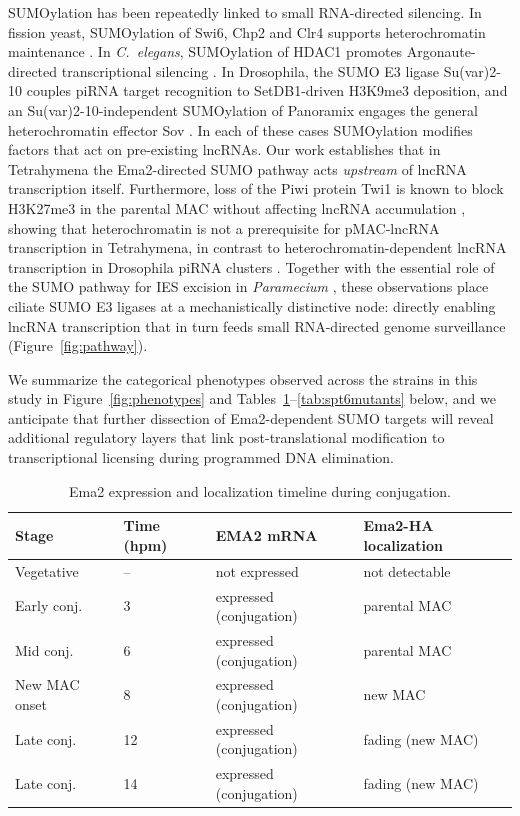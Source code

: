 \documentclass[11pt]{article}
\begin{document}
SUMOylation has been repeatedly linked to small RNA-directed silencing.
In fission yeast, SUMOylation of Swi6, Chp2 and Clr4 supports heterochromatin
maintenance \citep{shin2005sumo}. In \emph{C.~elegans}, SUMOylation of
HDAC1 promotes Argonaute-directed transcriptional silencing
\citep{kim2021hdac1}. In Drosophila, the SUMO E3 ligase Su(var)2-10
couples piRNA target recognition to SetDB1-driven H3K9me3 deposition, and
an Su(var)2-10-independent SUMOylation of Panoramix engages the general
heterochromatin effector Sov \citep{ninova2019suvar}. In each of these
cases SUMOylation modifies factors that act on pre-existing lncRNAs. Our
work establishes that in Tetrahymena the Ema2-directed SUMO pathway acts
\emph{upstream} of lncRNA transcription itself. Furthermore, loss of the
Piwi protein Twi1 is known to block H3K27me3 in the parental MAC without
affecting lncRNA accumulation \citep{liu2007rnai,mochizuki2002twi1},
showing that heterochromatin is not a prerequisite for pMAC-lncRNA
transcription in Tetrahymena, in contrast to heterochromatin-dependent
lncRNA transcription in Drosophila piRNA clusters
\citep{andersen2017heterochromatin}. Together with the essential role of
the SUMO pathway for IES excision in \emph{Paramecium}
\citep{matsuda2006sumo}, these observations place ciliate SUMO E3 ligases
at a mechanistically distinctive node: directly enabling lncRNA
transcription that in turn feeds small RNA-directed genome surveillance
(Figure~\ref{fig:pathway}).

We summarize the categorical phenotypes observed across the strains in
this study in Figure~\ref{fig:phenotypes} and
Tables~\ref{tab:timeline}--\ref{tab:spt6mutants} below, and we anticipate
that further dissection of Ema2-dependent SUMO targets will reveal
additional regulatory layers that link post-translational modification to
transcriptional licensing during programmed DNA elimination.

\begin{table}[htbp]
\centering
\caption{Ema2 expression and localization timeline during conjugation.}
\label{tab:timeline}
\begin{tabular}{llll}
\toprule
Stage & Time (hpm) & EMA2 mRNA & Ema2-HA localization \\
\midrule
Vegetative      & --    & not expressed           & not detectable              \\
Early conj.     & 3     & expressed (conjugation) & parental MAC                \\
Mid conj.       & 6     & expressed (conjugation) & parental MAC                \\
New MAC onset   & 8     & expressed (conjugation) & new MAC                     \\
Late conj.      & 12    & expressed (conjugation) & fading (new MAC)            \\
Late conj.      & 14    & expressed (conjugation) & fading (new MAC)            \\
\bottomrule
\end{tabular}
\end{table}
\end{document}
